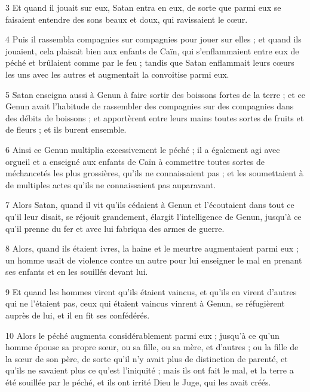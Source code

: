 \par 3 Et quand il jouait sur eux, Satan entra en eux, de sorte que parmi eux se faisaient entendre des sons beaux et doux, qui ravissaient le cœur.

\par 4 Puis il rassembla compagnies sur compagnies pour jouer sur elles ; et quand ils jouaient, cela plaisait bien aux enfants de Caïn, qui s'enflammaient entre eux de péché et brûlaient comme par le feu ; tandis que Satan enflammait leurs cœurs les uns avec les autres et augmentait la convoitise parmi eux.

\par 5 Satan enseigna aussi à Genun à faire sortir des boissons fortes de la terre ; et ce Genun avait l'habitude de rassembler des compagnies sur des compagnies dans des débits de boissons ; et apportèrent entre leurs mains toutes sortes de fruits et de fleurs ; et ils burent ensemble.

\par 6 Ainsi ce Genun multiplia excessivement le péché ; il a également agi avec orgueil et a enseigné aux enfants de Caïn à commettre toutes sortes de méchancetés les plus grossières, qu'ils ne connaissaient pas ; et les soumettaient à de multiples actes qu'ils ne connaissaient pas auparavant.

\par 7 Alors Satan, quand il vit qu'ils cédaient à Genun et l'écoutaient dans tout ce qu'il leur disait, se réjouit grandement, élargit l'intelligence de Genun, jusqu'à ce qu'il prenne du fer et avec lui fabriqua des armes de guerre.

\par 8 Alors, quand ils étaient ivres, la haine et le meurtre augmentaient parmi eux ; un homme usait de violence contre un autre pour lui enseigner le mal en prenant ses enfants et en les souillés devant lui.

\par 9 Et quand les hommes virent qu'ils étaient vaincus, et qu'ils en virent d'autres qui ne l'étaient pas, ceux qui étaient vaincus vinrent à Genun, se réfugièrent auprès de lui, et il en fit ses confédérés.

\par 10 Alors le péché augmenta considérablement parmi eux ; jusqu'à ce qu'un homme épouse sa propre sœur, ou sa fille, ou sa mère, et d'autres ; ou la fille de la sœur de son père, de sorte qu'il n'y avait plus de distinction de parenté, et qu'ils ne savaient plus ce qu'est l'iniquité ; mais ils ont fait le mal, et la terre a été souillée par le péché, et ils ont irrité Dieu le Juge, qui les avait créés.

